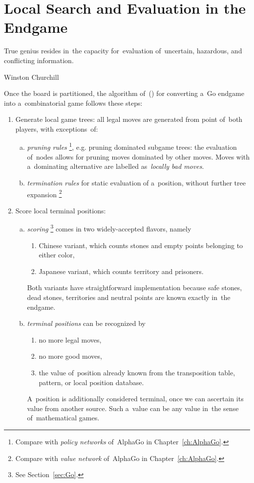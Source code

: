 \section{Local Search and Evaluation in the Endgame}
\epigraph{
  True genius resides in~the capacity for~evaluation of~uncertain, hazardous, and conflicting information. 
}{Winston Churchill}
Once the board is partitioned, the algorithm of~(\cite{Muller1995computer}) for converting a~Go endgame into a~combinatorial game follows these steps:
\begin{enumerate}
  \item Generate local game trees:
    all legal moves are generated from point of~both players, with exceptions~of:
    \begin{enumerate}[(a)]
      \item \emph{pruning rules}%
        \footnote{Compare with \emph{policy networks} of~AlphaGo in Chapter~\ref{ch:AlphaGo}.},
        e.g. pruning dominated subgame trees:
        the evaluation of~nodes allows for pruning moves dominated by other moves.
        Moves with a~dominating alternative are labelled as~\emph{locally bad moves}.

      \item \emph{termination rules} for static evaluation of a~position, without further tree expansion%
        \footnote{Compare with \emph{value network} of~AlphaGo in Chapter~\ref{ch:AlphaGo}.}
    \end{enumerate}

  \item Score local terminal positions:
    \begin{enumerate}[(a)]
      \item \emph{scoring}%
        \footnote{See Section~\ref{sec:Go}.}
        comes in two widely-accepted flavors, namely
        \begin{enumerate}[$\diamondsuit$]
          \item Chinese variant, which counts stones and empty points belonging to either color,
          \item Japanese variant, which counts territory and prisoners.
        \end{enumerate}
        Both variants have straightforward implementation because safe stones, dead stones, territories and neutral points are known exactly in~the endgame.

      \item \emph{terminal positions} can be recognized by
        \begin{enumerate}[$\diamondsuit$]
          \item no more legal moves,
          \item no more good moves,
          \item the value of~position already known from the transposition table, pattern, or local position database.
        \end{enumerate}
        A~position is additionally considered terminal, once we can ascertain its value from another source.
        Such a~value can be any value in~the sense of~mathematical games.


\end{enumerate}
\end{enumerate}
